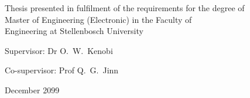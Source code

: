 \begin{titlepage}
\begin{center}
		{\large Thesis presented in fulfilment of the requirements for the degree of \\ Master of Engineering (Electronic) in the Faculty of \\ Engineering at Stellenbosch University \par}
		
		

		\vfill
		
		{\large {Supervisor}: Dr O.\ W.\ Kenobi}\par
    	{\large {Co-supervisor}: Prof Q.\ G.\ Jinn}

		\vfill
		{\large December 2099}
        \vfill
	\end{center}


		
				
		
		
		
		
		
		
		

\end{titlepage}
